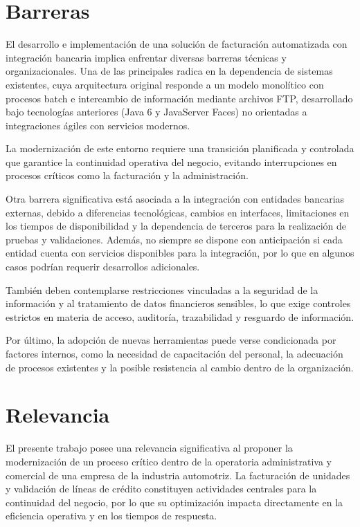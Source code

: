 \section{Barreras}

El desarrollo e implementación de una solución de facturación automatizada con integración bancaria implica enfrentar diversas barreras técnicas y organizacionales. Una de las principales radica en la dependencia de sistemas existentes, cuya arquitectura original responde a un modelo monolítico con procesos batch e intercambio de información mediante archivos FTP, desarrollado bajo tecnologías anteriores (Java 6 y JavaServer Faces) no orientadas a integraciones ágiles con servicios modernos.

La modernización de este entorno requiere una transición planificada y controlada que garantice la continuidad operativa del negocio, evitando interrupciones en procesos críticos como la facturación y la administración.

Otra barrera significativa está asociada a la integración con entidades bancarias externas, debido a diferencias tecnológicas, cambios en interfaces, limitaciones en los tiempos de disponibilidad y la dependencia de terceros para la realización de pruebas y validaciones. Además, no siempre se dispone con anticipación si cada entidad cuenta con servicios disponibles para la integración, por lo que en algunos casos podrían requerir desarrollos adicionales.

También deben contemplarse restricciones vinculadas a la seguridad de la información y al tratamiento de datos financieros sensibles, lo que exige controles estrictos en materia de acceso, auditoría, trazabilidad y resguardo de información.

Por último, la adopción de nuevas herramientas puede verse condicionada por factores internos, como la necesidad de capacitación del personal, la adecuación de procesos existentes y la posible resistencia al cambio dentro de la organización.

\section{Relevancia}

El presente trabajo posee una relevancia significativa al proponer la modernización de un proceso crítico dentro de la operatoria administrativa y comercial de una empresa de la industria automotriz. La facturación de unidades y validación de líneas de crédito constituyen actividades centrales para la continuidad del negocio, por lo que su optimización impacta directamente en la eficiencia operativa y en los tiempos de respuesta.

